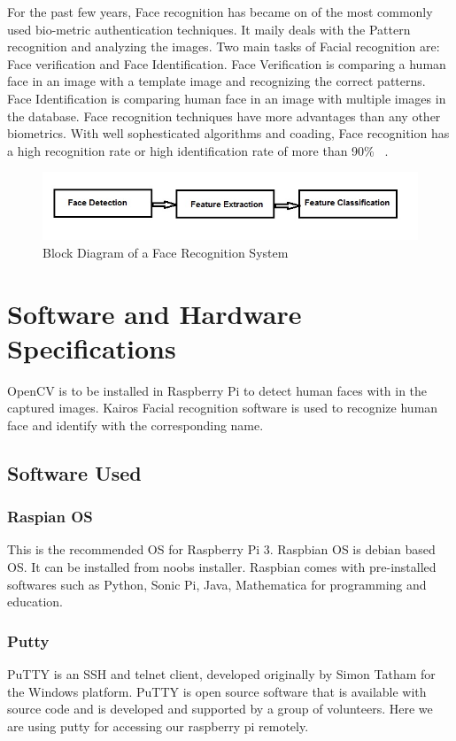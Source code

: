 \documentclass[sigconf]{acmart}
\begin{document}
For the past few years, Face recognition has became on of the most commonly used bio-metric authentication techniques. It maily deals with the Pattern recognition and analyzing the images. Two main tasks of Facial recognition are: Face verification and Face Identification. Face Verification is comparing a human face in an image with a template image and recognizing the correct patterns. Face Identification is comparing human face in an image with multiple images in the database. Face recognition techniques have more advantages than any other biometrics. With well sophesticated algorithms and coading, Face recognition has a high recognition rate or high identification rate of more than 90\% ~\cite{Riddhi2013}. 

\begin{figure}[ht!]
  \includegraphics[width=\columnwidth]{images/Face-recognition.jpg}
  \caption{Block Diagram of a Face Recognition System}
\end{figure}


\section{Software and Hardware Specifications}
OpenCV is to be installed in Raspberry Pi to detect human faces with in the captured images. Kairos Facial recognition software is used to recognize human face and identify with the corresponding name.

\subsection{Software Used}

\subsubsection{Raspian OS}
This is the recommended OS for Raspberry Pi 3.  Raspbian OS is debian based OS. It can be installed from noobs installer. Raspbian comes with pre-installed softwares such as Python, Sonic Pi, Java, Mathematica for programming and education.
\subsubsection{Putty}
PuTTY is an SSH and telnet client, developed originally by Simon Tatham for the Windows platform. PuTTY is open source software that is available with source code and is developed and supported by a group of volunteers. Here we are using putty for accessing our raspberry pi remotely.
\end{document}
